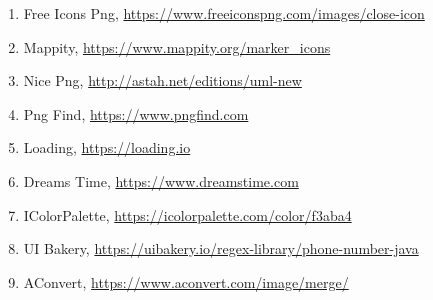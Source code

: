 \begin{enumerate}
            \item  Free Icons Png, 
           \url{https://www.freeiconspng.com/images/close-icon}

            \item  Mappity, 
           \url{https://www.mappity.org/marker_icons}

            \item  Nice Png, 
           \url{http://astah.net/editions/uml-new}
           
            \item  Png Find, 
           \url{https://www.pngfind.com}
           
            \item  Loading, 
           \url{https://loading.io}
           
            \item  Dreams Time, 
           \url{https://www.dreamstime.com}
           
            \item  IColorPalette, 
           \url{https://icolorpalette.com/color/f3aba4}
           
            \item  UI Bakery, 
           \url{https://uibakery.io/regex-library/phone-number-java}
           
            \item  AConvert, 
           \url{https://www.aconvert.com/image/merge/}

			
		\end{enumerate}
		
		 